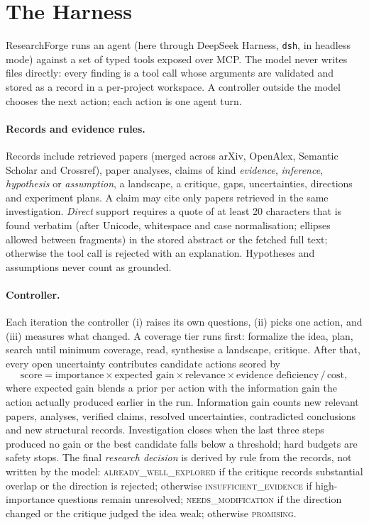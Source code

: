 \section{The Harness}\label{sec:system}

ResearchForge runs an agent (here through DeepSeek Harness, \texttt{dsh}, in headless mode) against a set of typed tools exposed over MCP. The model never writes files directly: every finding is a tool call whose arguments are validated and stored as a record in a per-project workspace. A controller outside the model chooses the next action; each action is one agent turn.

\paragraph{Records and evidence rules.} Records include retrieved papers (merged across arXiv, OpenAlex, Semantic Scholar and Crossref), paper analyses, claims of kind \emph{evidence}, \emph{inference}, \emph{hypothesis} or \emph{assumption}, a landscape, a critique, gaps, uncertainties, directions and experiment plans. A claim may cite only papers retrieved in the same investigation. \emph{Direct} support requires a quote of at least 20 characters that is found verbatim (after Unicode, whitespace and case normalisation; ellipses allowed between fragments) in the stored abstract or the fetched full text; otherwise the tool call is rejected with an explanation. Hypotheses and assumptions never count as grounded.

\paragraph{Controller.} Each iteration the controller (i) raises its own questions, (ii) picks one action, and (iii) measures what changed. A coverage tier runs first: formalize the idea, plan, search until minimum coverage, read, synthesise a landscape, critique. After that, every open uncertainty contributes candidate actions scored by
\[\text{score} = \text{importance}\times\text{expected gain}\times\text{relevance}\times\text{evidence deficiency}\,/\,\text{cost},\]
where expected gain blends a prior per action with the information gain the action actually produced earlier in the run. Information gain counts new relevant papers, analyses, verified claims, resolved uncertainties, contradicted conclusions and new structural records. Investigation closes when the last three steps produced no gain or the best candidate falls below a threshold; hard budgets are safety stops. The final \emph{research decision} is derived by rule from the records, not written by the model: \textsc{already\_well\_explored} if the critique records substantial overlap or the direction is rejected; otherwise \textsc{insufficient\_evidence} if high-importance questions remain unresolved; \textsc{needs\_modification} if the direction changed or the critique judged the idea weak; otherwise \textsc{promising}.

